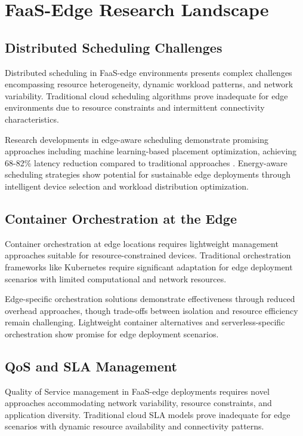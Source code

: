 \section{FaaS-Edge Research Landscape}

\subsection{Distributed Scheduling Challenges}

Distributed scheduling in FaaS-edge environments presents complex challenges encompassing resource heterogeneity, dynamic workload patterns, and network variability. Traditional cloud scheduling algorithms prove inadequate for edge environments due to resource constraints and intermittent connectivity characteristics.

Research developments in edge-aware scheduling demonstrate promising approaches including machine learning-based placement optimization, achieving 68-82\% latency reduction compared to traditional approaches \cite{wang2021edgeserve}. Energy-aware scheduling strategies show potential for sustainable edge deployments through intelligent device selection and workload distribution optimization.

\subsection{Container Orchestration at the Edge}

Container orchestration at edge locations requires lightweight management approaches suitable for resource-constrained devices. Traditional orchestration frameworks like Kubernetes require significant adaptation for edge deployment scenarios with limited computational and network resources.

Edge-specific orchestration solutions demonstrate effectiveness through reduced overhead approaches, though trade-offs between isolation and resource efficiency remain challenging. Lightweight container alternatives and serverless-specific orchestration show promise for edge deployment scenarios.

\subsection{QoS and SLA Management}

Quality of Service management in FaaS-edge deployments requires novel approaches accommodating network variability, resource constraints, and application diversity. Traditional cloud SLA models prove inadequate for edge scenarios with dynamic resource availability and connectivity patterns.

